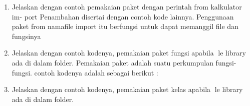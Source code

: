 \begin{enumerate}
\begin{itemize}
    \end{itemize}
    

    \item Jelaskan dengan contoh pemakaian paket dengan perintah from kalkulator im-
    port Penambahan disertai dengan contoh kode lainnya.
    Penggunaan paket from namafile import itu berfungsi untuk dapat memanggil file dan fungsinya
    

    \item Jelaskan dengan contoh kodenya, pemakaian paket fungsi apabila le library
    ada di dalam folder.
    Pemakaian paket adalah suatu perkumpulan fungsi-fungsi. contoh kodenya adalah sebagai berikut :

    \item Jelaskan dengan contoh kodenya, pemakaian paket kelas apabila le library ada
    di dalam folder.
    

\end{enumerate}
